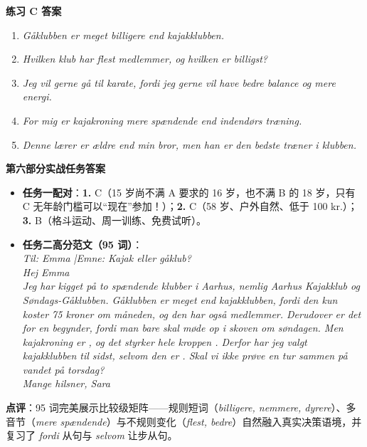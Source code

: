 \begin{answerbox}
\textbf{练习 C 答案}
\begin{enumerate}
  \item \textit{Gåklubben er meget billigere end kajakklubben.}
  \item \textit{Hvilken klub har flest medlemmer, og hvilken er billigst?}
  \item \textit{Jeg vil gerne gå til karate, fordi jeg gerne vil have bedre balance og mere energi.}
  \item \textit{For mig er kajakroning mere spændende end indendørs træning.}
  \item \textit{Denne lærer er ældre end min bror, men han er den bedste træner i klubben.}
\end{enumerate}

\textbf{第六部分实战任务答案}
\begin{itemize}
  \item \textbf{任务一配对}：\textbf{1.} C（15 岁尚不满 A 要求的 16 岁，也不满 B 的 18 岁，只有 C 无年龄门槛可以“现在”参加！）；\textbf{2.} C（58 岁、户外自然、低于 100 kr.）；\textbf{3.} B（格斗运动、周一训练、免费试听）。
  \item \textbf{任务二高分范文（95 词）}：\\
    \textit{Til: Emma \quad|\quad Emne: Kajak eller gåklub?}\\
    \textit{Hej Emma}\\
    \textit{Jeg har kigget på to spændende klubber i Aarhus, nemlig Aarhus Kajakklub og Søndags-Gåklubben. Gåklubben er meget  end kajakklubben, fordi den kun koster 75 kroner om måneden, og den har også  medlemmer. Derudover er det  for en begynder, fordi man bare skal møde op i skoven om søndagen. Men kajakroning er , og det styrker hele kroppen . Derfor har jeg valgt kajakklubben til sidst, selvom den er . Skal vi ikke prøve en tur sammen på vandet på torsdag?}\\
    \textit{Mange hilsner, Sara}
\end{itemize}

\small\textbf{点评}：95 词完美展示比较级矩阵——规则短词（\textit{billigere, nemmere, dyrere}）、多音节（\textit{mere spændende}）与不规则变化（\textit{flest, bedre}）自然融入真实决策语境，并复习了 \textit{fordi} 从句与 \textit{selvom} 让步从句。
\end{answerbox}
